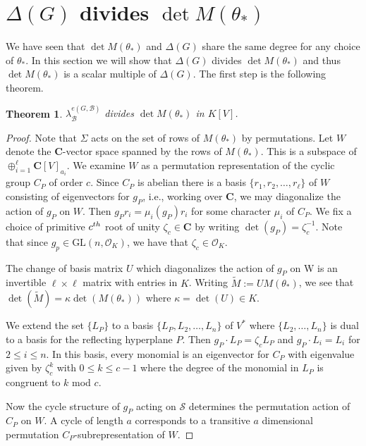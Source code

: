 \documentclass[12pt]{amsart}
\renewcommand{\leq}{\leqslant}
\def\GL{\text{GL}}
\newcommand{\CC}{\mathbf{C}} %
\newcommand{\CC}{\mathbb{C}} %
\newcommand{\KK}{K}
\newcommand{\OK}{{{\mathcal O}_K}}
\newtheorem{thm}{Theorem}[section]
\theoremstyle{definition}
\newcommand{\calb}{\mathcal{B}}
\newcommand{\cals}{\mathcal{S}}
\newcommand{\set}[1]{\{#1\}}
\newcommand{\bth}{{{\theta_*}}} %
\begin{document}
\section{$\Delta(G)$ divides $\det M({\bth})$}\label{section:divides}

We have seen that $\det M(\bth)$ and $\Delta(G)$ share the same degree for any choice of $\bth$.
In this section we will show that $\Delta(G)$ divides $\det M(\bth)$
and thus $\det M(\bth)$ is a scalar multiple of $\Delta(G)$.  
The first step is the following theorem.

\begin{thm}
$\lambda_\calb^{e(G,\calb)}$ divides $\det M(\bth)$ in $\KK[V]$.  
\end{thm}

 \begin{proof}
 Note that $\Sigma$ acts on the set of rows of $M(\theta_*)$ by permutations.
 Let $W$ denote the $\CC$-vector space spanned by the rows of $M(\theta_*)$.  
 This is a subspace of $\oplus_{i=1}^\ell \CC[V]_{a_i}$.  
 We examine $W$ as a permutation representation of the cyclic group $C_P$ of order $c$.
 Since $C_P$ is abelian there is a basis $\set{r_1,r_2,\dots,r_\ell}$ of $W$ consisting of eigenvectors for $g_P$,
 i.e., working over $\CC$, we may diagonalize the action of $g_P$  on $W$.   Then $g_P r_i = \mu_i(g_P) r_i$ for some character $\mu_i$ of $C_P$.  We fix a choice of primitive $c^{\rm{th}}$ root of unity $\zeta_c\in\CC$ by writing $\det(g_P)=\zeta_c^{-1}$. 
 Note that since $g_p \in \GL(n,\OK)$, we have that $\zeta_c \in \OK$.

 The change of basis matrix $U$ which diagonalizes the 
 action of $g_P$ on W is an
invertible $\ell \times \ell$ matrix with entries in $K$.
Writing $\widetilde M := U M(\bth)$, we see that 
$\det (\widetilde M) = \kappa \det(M(\bth))$ where 
$\kappa = \det(U) \in K$.

We extend the set $\{L_P\}$
to a basis $\{L_P,L_2,\dots,L_n\}$ of $V^*$ where $\{L_2,\dots,L_n\}$ is dual to a basis for the reflecting hyperplane $P$.
Then $g_P \cdot L_P = \zeta_c L_P$ and $g_P \cdot L_i = L_i$
for $2 \leq i \leq n$.  
In this basis, every monomial is an eigenvector for $C_P$
with eigenvalue given by $\zeta_c^k$ with 
$0 \leq k \leq c-1$ where the degree of the monomial in $L_P$
is congruent to $k$ mod $c$.



 Now the cycle structure of $g_P$ acting on $\cals$ determines the permutation action of $C_P$ on $W$.
 A cycle of length $a$ corresponds to a transitive $a$ dimensional permutation $C_P$-subrepresentation of $W$.
 

\end{proof}
\end{document}
